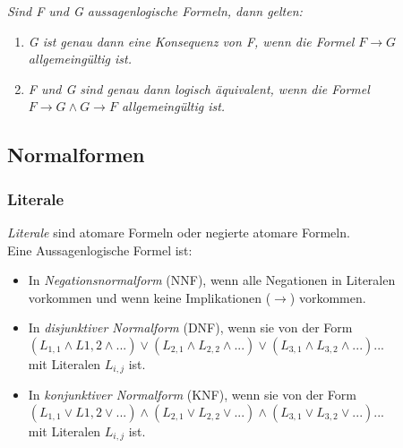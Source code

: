 \textit{Sind F und G aussagenlogische Formeln, dann gelten:}
\begin{enumerate}
 \item \textit{G ist genau dann eine Konsequenz von F, wenn die Formel $F \rightarrow G$ allgemeingültig ist.}
 \item \textit{F und G sind genau dann logisch äquivalent, wenn die Formel $F \rightarrow G \land G \rightarrow F$ allgemeingültig ist.}
\end{enumerate}

\subsection{Normalformen}%
\label{sub:normalformen}

\subsubsection{Literale}%
\label{ssub:literale}
\begin{minipage}{0.9\linewidth}
\textit{Literale} sind atomare Formeln oder negierte atomare Formeln. \\
Eine Aussagenlogische Formel ist:
\begin{itemize}
 \item In \textit{Negationsnormalform} (NNF), wenn alle Negationen in Literalen vorkommen und wenn keine Implikationen ($\to$) vorkommen.
 \item In \textit{disjunktiver Normalform} (DNF), wenn sie von der Form \\
 $(L_{1,1}\land L{1,2} \land ...) \lor (L_{2,1} \land L_{2,2} \land ...) \lor (L_{3,1} \land L_{3,2} \land ...)...$ \\
 mit Literalen $L_{i,j}$ ist.
 \item In \textit{konjunktiver Normalform} (KNF), wenn sie von der Form \\
 $(L_{1,1}\lor L{1,2} \lor ...) \land (L_{2,1} \lor L_{2,2} \lor ...) \land (L_{3,1} \lor L_{3,2} \lor ...)...$ \\
 mit Literalen $L_{i,j}$ ist.
\end{itemize}
\end{minipage}
